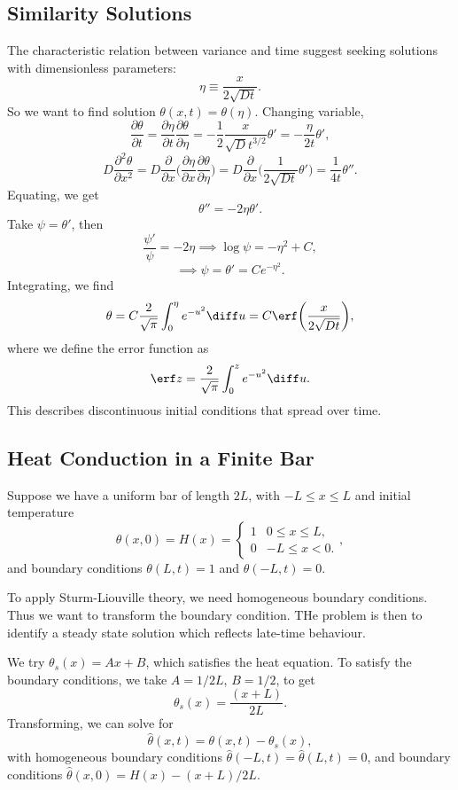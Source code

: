 \documentclass[12pt]{article}
\begin{document}
\subsection{Similarity Solutions}%
\label{sub:similarity_solutions}

The characteristic relation between variance and time suggest seeking solutions with dimensionless parameters:
\[
	\eta \equiv \frac{x}{2 \sqrt{Dt}}
.\]
So we want to find solution $\theta(x, t) = \theta(\eta)$. Changing variable,
\[
	\frac{\partial \theta}{\partial t} = \frac{\partial \eta}{\partial t} \frac{\partial \theta}{\partial \eta} = -\frac{1}{2}\frac{x}{\sqrt D t^{3/2}} \theta' = - \frac{\eta}{2t} \theta'
,\]
\[
	D \frac{\partial^2 \theta}{\partial x^2} = D \frac{\partial}{\partial x} \biggl( \frac{\partial \eta}{\partial x} \frac{\partial \theta}{\partial \eta} \biggr) = D \frac{\partial}{\partial x} \biggl( \frac{1}{2 \sqrt{Dt}} \theta' \biggr) = \frac{1}{4t} \theta''
.\]
Equating, we get
\[
\theta'' = - 2 \eta \theta'
.\]
Take $\psi = \theta'$, then
\[
\frac{\psi'}{\psi} = - 2 \eta \implies \log \psi = - \eta^2 + C
,\]
\[
\implies \psi = \theta' = C e^{-\eta^2}
.\]
Integrating, we find
\[
	\theta = C \frac{2}{\sqrt \pi} \int_{0}^{\eta} e^{-u^2} \diff u = C \erf \biggl( \frac{x}{2 \sqrt{Dt}} \biggr)
,\]
where we define the error function as
\[
\erf z = \frac{2}{\sqrt \pi} \int_{0}^{z} e^{-u^2}\diff u
.\]
This describes discontinuous initial conditions that spread over time.

\subsection{Heat Conduction in a Finite Bar}%
\label{sub:heat_conduction_in_a_finite_bar}

Suppose we have a uniform bar of length $2L$, with $-L \leq x \leq L$ and initial temperature
\[
	\theta(x, 0) = H(x) =
	\begin{cases}
		1 & 0 \leq x \leq L, \\
		0 & -L \leq x < 0.
	\end{cases}
,\]
and boundary conditions $\theta(L, t) = 1$ and $\theta(-L, t) = 0$.

To apply Sturm-Liouville theory, we need homogeneous boundary conditions. Thus we want to transform the boundary condition. THe problem is then to identify a steady state solution which reflects late-time behaviour.

We try $\theta_s(x) = Ax + B$, which satisfies the heat equation. To satisfy the boundary conditions, we take $A = 1/2L$, $B = 1/2$, to get
\[
	\theta_s(x) = \frac{(x + L)}{2L}
.\]
Transforming, we can solve for
\[
	\hat \theta(x, t) = \theta(x, t) - \theta_s(x)
,\]
with homogeneous boundary conditions $\hat \theta(-L, t) = \hat \theta(L, t) = 0$, and boundary conditions $\hat \theta(x, 0) = H(x) - (x+L)/2L$.
\end{document}
